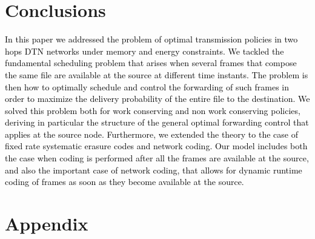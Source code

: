 \documentclass[10pt,twocolumn,conference,final]{IEEEtran}
\begin{document}
\section{Conclusions}\label{sec:concl}
\textcolor{black}{In this paper we addressed the problem of optimal transmission policies in two hops DTN networks 
under memory and energy constraints. We tackled the fundamental scheduling problem that arises 
when several frames that compose the same file are available at the source at different time instants. 
The problem is then how to optimally schedule and control the forwarding of such 
frames in order to maximize the delivery probability of the entire file to the destination. 
We solved this problem both for work conserving and non work conserving policies, deriving in particular 
the structure of the general optimal forwarding control that applies at the source node. Furthermore, 
we extended the theory to the case of fixed rate systematic erasure codes and network coding. 
Our model includes both the case when coding is performed after all the frames are available at the source, 
and also the important case of network coding, that allows for dynamic runtime coding of frames as soon as they 
become available at the source.} 

\section{Appendix}
\end{document}

